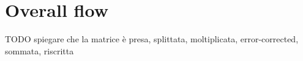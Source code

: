 \section{Overall flow}
TODO spiegare che la matrice è presa, splittata, moltiplicata, error-corrected, sommata, riscritta
